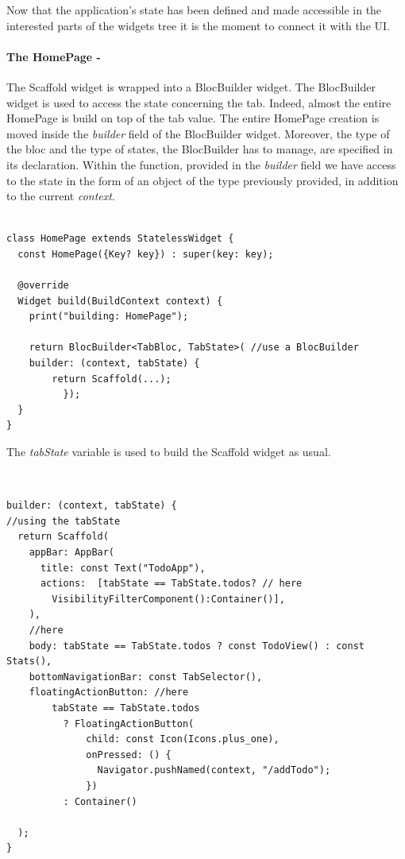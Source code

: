 Now that the application's state has been defined and  made accessible in the interested parts of the widgets tree it is the moment to connect it with the UI.

\paragraph{The HomePage - }
\label{subpar:todo_app_bloc_core_state}

The Scaffold widget is wrapped into a BlocBuilder widget. The BlocBuilder widget is used to access the state concerning the tab. Indeed, almost the entire HomePage is build on top of the tab value. The entire HomePage creation is moved inside the \textit{builder} field of the BlocBuilder widget. Moreover, the type of the bloc and the type of states, the BlocBuilder has to manage, are specified in its declaration. Within the function, provided in the \textit{builder} field we have access to the state in the form of an object of the type previously provided, in addition to the current \textit{context}.
\begin{code}

\label{code:2.14}
\begin{verbatim}

class HomePage extends StatelessWidget {
  const HomePage({Key? key}) : super(key: key);

  @override
  Widget build(BuildContext context) {
    print("building: HomePage");

    return BlocBuilder<TabBloc, TabState>( //use a BlocBuilder
    builder: (context, tabState) {
    	return Scaffold(...);
          });
  }
}
\end{verbatim}
\end{code}
The \textit{tabState} variable is used to build the Scaffold widget as usual.
\begin{code}
\mbox{}\\
 \mbox{}
\label{code:2.14}
\begin{verbatim}
builder: (context, tabState) {
//using the tabState
  return Scaffold(
    appBar: AppBar(
      title: const Text("TodoApp"),
      actions:  [tabState == TabState.todos? // here
        VisibilityFilterComponent():Container()],
    ),
    //here
    body: tabState == TabState.todos ? const TodoView() : const Stats(),
    bottomNavigationBar: const TabSelector(),
    floatingActionButton: //here
        tabState == TabState.todos
          ? FloatingActionButton(
              child: const Icon(Icons.plus_one),
              onPressed: () {
                Navigator.pushNamed(context, "/addTodo");
              })
          : Container()

  );
}
\end{verbatim}
\mbox{}
\end{code}
